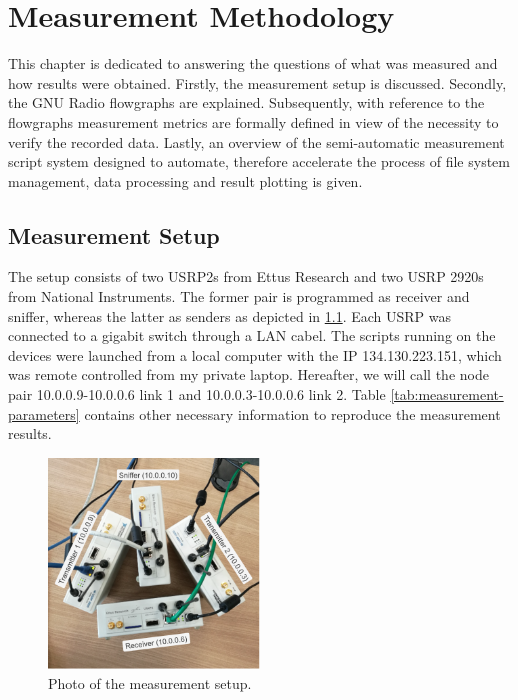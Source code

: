 \chapter{Measurement Methodology}

This chapter is dedicated to answering the questions of what was measured and how results were obtained. Firstly, the measurement setup is discussed. Secondly,  the GNU Radio flowgraphs are explained. Subsequently, with reference to the flowgraphs measurement metrics are formally defined in view of the necessity to verify the recorded data.  Lastly, an overview of the semi-automatic measurement script system designed to automate, therefore accelerate the process of file system management, data processing and result plotting is given.

\section{Measurement Setup}

The setup consists of two USRP2s from Ettus Research and two USRP 2920s from National Instruments. The former pair is programmed as receiver and sniffer, whereas the latter as senders as depicted in \ref{fig:measurement-setup}. Each USRP was connected to a gigabit switch through a LAN cabel. The scripts running on the devices were launched from a local computer with the IP 134.130.223.151, which was remote controlled from my private laptop. Hereafter, we will call the node pair 10.0.0.9-10.0.0.6 link 1 and 10.0.0.3-10.0.0.6 link 2. Table \ref{tab:measurement-parameters} contains other necessary information to reproduce the measurement results.

\begin{figure}[tb]
	\label{fig:measurement-setup}
	\begin{center}
		\includegraphics[width=0.5\textwidth]{pictures/measurement_setup}
	\end{center}
	\caption{Photo of the measurement setup.}
\end{figure}

